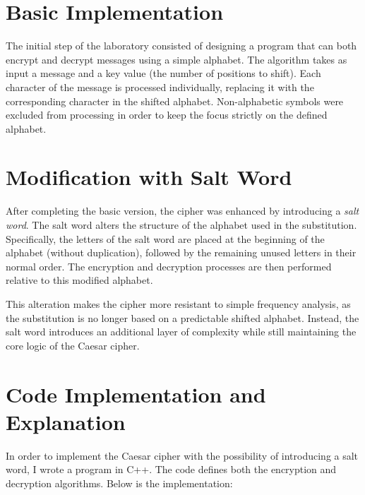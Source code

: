 \documentclass[12pt]{article}
\begin{document}
\section{Basic Implementation}
The initial step of the laboratory consisted of designing a program that can both encrypt and decrypt 
messages using a simple alphabet. The algorithm takes as input a message and a key value (the number 
of positions to shift). Each character of the message is processed individually, replacing it with the 
corresponding character in the shifted alphabet. Non-alphabetic symbols were excluded from 
processing in order to keep the focus strictly on the defined alphabet.

\section{Modification with Salt Word}
After completing the basic version, the cipher was enhanced by introducing a \textit{salt word}. 
The salt word alters the structure of the alphabet used in the substitution. Specifically, the letters of 
the salt word are placed at the beginning of the alphabet (without duplication), followed by the 
remaining unused letters in their normal order. The encryption and decryption processes are then 
performed relative to this modified alphabet.

This alteration makes the cipher more resistant to simple frequency analysis, as the substitution 
is no longer based on a predictable shifted alphabet. Instead, the salt word introduces an additional 
layer of complexity while still maintaining the core logic of the Caesar cipher.

\section{Code Implementation and Explanation}

In order to implement the Caesar cipher with the possibility of introducing a salt word, I wrote 
a program in C++. The code defines both the encryption and decryption algorithms. Below is the 
implementation:
\end{document}
